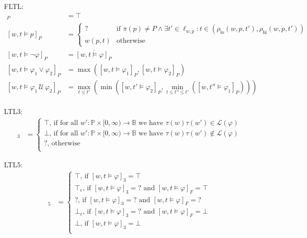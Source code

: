 \documentclass[envcountsame, runningheads]{llncs}
\newcommand{\B}{\mathbb{B}}
\def\until{\,\mathcal{U}\,}
\def\since{\,\mathcal{S}\,}
\newcommand{\?}{\text{?}}
\begin{document}
	\vspace{1em}
	FLTL:
	\begin{align*}
		[w,t \models \texttt{true}]_P &= \top \\
		[w,t \models p]_P &= \begin{cases}
			? &\text{if } \pi(p) \not = P \land \exists t' \in \ell_{w,p} : t \in (\rho_{\text{lo}}(w, p, t'), \rho_{\text{hi}}(w, p, t')) \\
			w(p,t) &\text{otherwise}			
		\end{cases} \\
		[w,t \models \lnot \varphi]_P &= \overline{[w,t \models \varphi]_P}\\
		[w,t \models \varphi_1 \lor \varphi_2]_P &= \max([w,t \models \varphi_1]_P, [w,t \models \varphi_2]_P)\\
		[w,t \models \varphi_1 \until \varphi_2]_P &= \max_{t \leq t'} \left( \min \left( [w,t' \models \varphi_2]_P, \min_{t \leq t'' \leq t'} \left( [w,t'' \models \varphi_1]_P \right) \right) \right)\\
	\end{align*}
	
	LTL3:
	\begin{align*}
		[w,t \models \varphi]_3 &= \begin{cases}
			\top \text{, if for all }  w' : \mathbb{P} \times [0, \infty) \to \B  \text{ we have } \tau(w) \tau(w') \in \mathcal{L}(\varphi)\\
			\bot \text{, if for all }  w' : \mathbb{P} \times [0, \infty) \to \B  \text{ we have } \tau(w) \tau(w') \notin \mathcal{L}(\varphi)\\
			? \text{, otherwise}\\
		\end{cases}
	\end{align*}
	
	LTL5:
	\begin{align*}
		[w,t \models \varphi]_{5} &= \begin{cases}
			\top \text{, if } [w,t \models \varphi]_3 = \top \\
			\top_c \text{, if } [w,t \models \varphi]_3 = ? \text{ and } [w,t \models \varphi]_F = \top \\
			? \text{, if } [w,t \models \varphi]_3 = ? \text{ and } [w,t \models \varphi]_F = ? \\
			\bot_c \text{, if } [w,t \models \varphi]_3 = ? \text{ and } [w,t \models \varphi]_F = \bot \\
			\bot \text{, if } [w,t \models \varphi]_3 = \bot \\
		\end{cases} \\
	\end{align*}	
	
\end{document}
